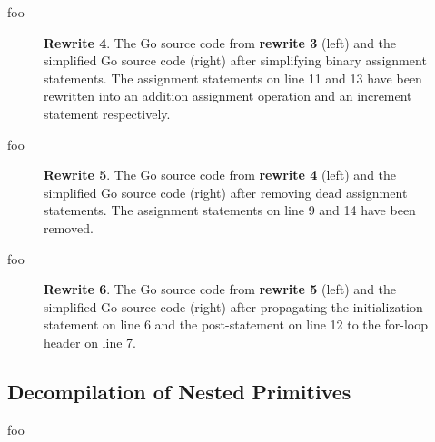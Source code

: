 foo

\begin{figure}[htbp]
	\centering
	\begin{subfigure}[t]{0.45\textwidth}
		
	\end{subfigure}
	\qquad
	\begin{subfigure}[t]{0.45\textwidth}
		
	\end{subfigure}
	\caption{\textbf{Rewrite 4}. The Go source code from \textbf{rewrite 3} (left) and the simplified Go source code (right) after simplifying binary assignment statements. The assignment statements on line 11 and 13 have been rewritten into an addition assignment operation and an increment statement respectively.}
	\label{fig:rewrite_4}
\end{figure}

foo

\begin{figure}[htbp]
	\centering
	\begin{subfigure}[t]{0.45\textwidth}
		
	\end{subfigure}
	\qquad
	\begin{subfigure}[t]{0.45\textwidth}
		
	\end{subfigure}
	\caption{\textbf{Rewrite 5}. The Go source code from \textbf{rewrite 4} (left) and the simplified Go source code (right) after removing dead assignment statements. The assignment statements on line 9 and 14 have been removed.}
	\label{fig:rewrite_5}
\end{figure}

foo

\begin{figure}[htbp]
	\centering
	\begin{subfigure}[t]{0.45\textwidth}
		
	\end{subfigure}
	\qquad
	\begin{subfigure}[t]{0.45\textwidth}
		
	\end{subfigure}
	\caption{\textbf{Rewrite 6}. The Go source code from \textbf{rewrite 5} (left) and the simplified Go source code (right) after propagating the initialization statement on line 6 and the post-statement on line 12 to the for-loop header on line 7.}
	\label{fig:rewrite_6}
\end{figure}


\subsection{Decompilation of Nested Primitives}

foo
